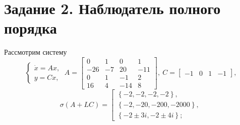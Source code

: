 \documentclass[a4paper, 12pt]{article}
\begin{document}
    \section{Задание 2. Наблюдатель полного порядка}
    Рассмотрим систему
    $$
    \begin{cases}
        \dot{x}=Ax,\\
        y=Cx,
    \end{cases}\ A=\begin{bmatrix}
        0 &1 &0 &1\\
        -26 &-7 &20 &-11\\
        0 &1 &-1 &2\\
        16 &4 &-14 &8
    \end{bmatrix},\ C=\begin{bmatrix}
        -1 &0 &1 &-1
    \end{bmatrix},
    $$
    $$
    \sigma\left(A+LC\right)= 
    \left[ 
      \begin{gathered} 
        \left\{-2,-2,-2, -2\right\}, \\ 
        \left\{-2,-20,-200, -2000\right\},\\
        \left\{-2\pm3i,-2\pm4i\right\};
      \end{gathered} 
\right.
    $$
\end{document}
